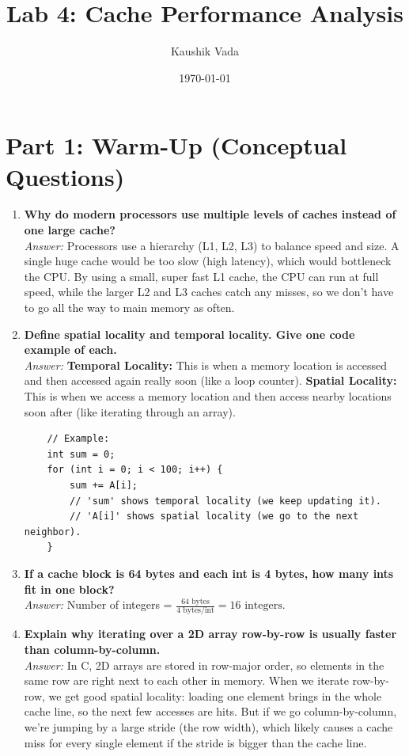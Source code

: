 \documentclass{article}
\title{Lab 4: Cache Performance Analysis}
\author{Kaushik Vada}
\date{\today}
\begin{document}
\maketitle

\section{Part 1: Warm-Up (Conceptual Questions)}
\begin{enumerate}
    \item \textbf{Why do modern processors use multiple levels of caches instead of one large cache?} \\
    \textit{Answer:} Processors use a hierarchy (L1, L2, L3) to balance speed and size. A single huge cache would be too slow (high latency), which would bottleneck the CPU. By using a small, super fast L1 cache, the CPU can run at full speed, while the larger L2 and L3 caches catch any misses, so we don't have to go all the way to main memory as often.

    \item \textbf{Define spatial locality and temporal locality. Give one code example of each.} \\
    \textit{Answer:} 
    \textbf{Temporal Locality:} This is when a memory location is accessed and then accessed again really soon (like a loop counter).
    \textbf{Spatial Locality:} This is when we access a memory location and then access nearby locations soon after (like iterating through an array).
    
    \begin{verbatim}
    // Example:
    int sum = 0;
    for (int i = 0; i < 100; i++) {
        sum += A[i]; 
        // 'sum' shows temporal locality (we keep updating it).
        // 'A[i]' shows spatial locality (we go to the next neighbor).
    }
    \end{verbatim}

    \item \textbf{If a cache block is 64 bytes and each int is 4 bytes, how many ints fit in one block?} \\
    \textit{Answer:} Number of integers = $\frac{64 \text{ bytes}}{4 \text{ bytes/int}} = 16 \text{ integers}$.

    \item \textbf{Explain why iterating over a 2D array row-by-row is usually faster than column-by-column.} \\
    \textit{Answer:} In C, 2D arrays are stored in row-major order, so elements in the same row are right next to each other in memory. When we iterate row-by-row, we get good spatial locality: loading one element brings in the whole cache line, so the next few accesses are hits. But if we go column-by-column, we're jumping by a large stride (the row width), which likely causes a cache miss for every single element if the stride is bigger than the cache line.
\end{enumerate}
\end{document}
